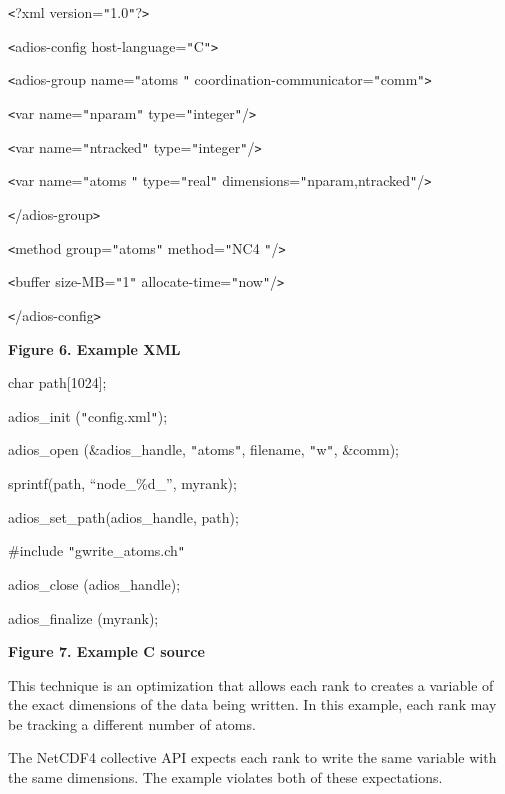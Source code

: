 \leftskip=18pt
\texttt{<}?xml version=\texttt{"}1.0\texttt{"}?\texttt{>}

\texttt{<}adios-config host-language=\texttt{"}C\texttt{"}\texttt{>}

\parindent=14pt
\texttt{<}adios-group name=\texttt{"}atoms \texttt{"} coordination-communicator=\texttt{"}comm\texttt{"}\texttt{>}

\parindent=28pt
\texttt{<}var name=\texttt{"}nparam\texttt{"} type=\texttt{"}integer\texttt{"}/\texttt{>}

\texttt{<}var name=\texttt{"}ntracked\texttt{"} type=\texttt{"}integer\texttt{"}/\texttt{>}

\parindent=57pt
\texttt{<}var name=\texttt{"}atoms \texttt{"} type=\texttt{"}real\texttt{"} dimensions=\texttt{"}nparam,ntracked\texttt{"}/\texttt{>}

\parindent=14pt
\texttt{<}/adios-group\texttt{>}

\parindent=0pt
\texttt{<}method group=\texttt{"}atoms\texttt{"} method=\texttt{"}NC4 \texttt{"}/\texttt{>}

\texttt{<}buffer size-MB=\texttt{"}1\texttt{"} allocate-time=\texttt{"}now\texttt{"}/\texttt{>}

\texttt{<}/adios-config\texttt{>}

\label{HToc144350165}

{\color{color20} \textbf{Figure 6. Example XML}}



char path[1024];

adios\_init (\texttt{"}config.xml\texttt{"});

adios\_open (\&adios\_handle, \texttt{"}atoms\texttt{"}, filename, \texttt{"}w\texttt{"}, 
\&comm);

sprintf(path, ``node\_\%d\_'', myrank);

adios\_set\_path(adios\_handle, path);

\#include \texttt{"}gwrite\_atoms.ch\texttt{"}

adios\_close (adios\_handle);

adios\_finalize (myrank);

{\color{color20} \textbf{Figure 7. Example C source}}

\leftskip=0pt
This technique is an optimization that allows each rank to creates a variable of 
the exact dimensions of the data being written.  In this example, each rank may 
be tracking a different number of atoms.

The NetCDF4 collective API expects each rank to write the same variable with the 
same dimensions.  The example violates both of these expectations.

